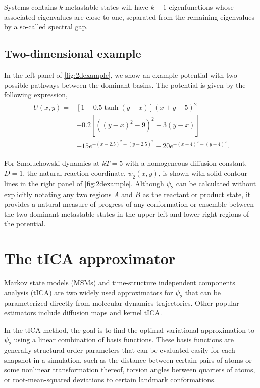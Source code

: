 \documentclass[aip, jcp, reprint, nolinenumbers, twocolumn, nobalancelastpage, nofootinbib]{revtex4-1}
\begin{document}
Systems contains $k$ metastable states will have $k-1$ eigenfunctions whose associated eigenvalues are close to one, separated from the remaining eigenvalues by a so-called spectral gap.\cite{prinz2011markov}

\subsection{Two-dimensional example}
In the left panel of \cref{fig:2dexample}, we show an example potential with two possible pathways between the dominant basins. The potential is given by the following expression,\cite{rhee2005onedimensional}
\begin{align}
\begin{split}
U(x,y) = &[1 - 0.5 \tanh(y - x)](x + y - 5)^2 \\
   &+ 0.2[((y - x)^2 - 9)^2 + 3(y - x)] \\
   &- 15e^{-(x-2.5)^2-(y-2.5)^2} - 20e^{-(x-4)^2-(y-4)^2}.
\end{split}
\end{align}

For Smoluchowski dynamics at $kT=5$ with a homogeneous diffusion constant, $D=1$, the natural reaction coordinate, $\psi_2(x,y)$, is shown with solid contour lines in the right panel of \cref{fig:2dexample}. Although $\psi_2$ can be calculated without explicitly notating any two regions $A$ and $B$ as the reactant or product state, it provides a natural measure of progress of any conformation or ensemble between the two dominant metastable states in the upper left and lower right regions of the potential.


\section{The tICA approximator}

Markov state models (MSMs) and time-structure independent components analysis (tICA) are two widely used approximators for $\psi_2$ that can be parameterized directly from molecular dynamics trajectories.\cite{prinz2011markov, shukla2015markov, schwantes2013improvements, perez2013identification} Other popular estimators include diffusion maps and kernel tICA.\cite{nadler2006diffusion, coifman2008diffusion, rohrdanz2011determination, shwantes2015modeling, kim2015systematic}

In the tICA method, the goal is to find the optimal variational approximation to $\psi_2$ using a linear combination of basis functions. These basis functions are generally structural order parameters that can be evaluated easily for each snapshot in a simulation, such as the distance between certain pairs of atoms or some nonlinear transformation thereof, torsion angles between quartets of atoms, or root-mean-squared deviations to certain landmark conformations.
\end{document}
